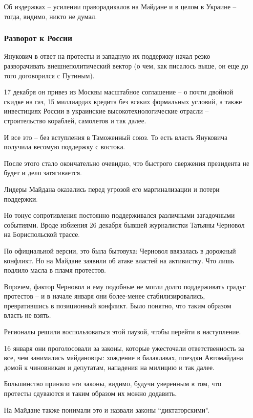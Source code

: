 Об издержках – усилении праворадикалов на Майдане и в целом в Украине –
тогда, видимо, никто не думал.  

\subsubsection{Разворот к России }

Янукович в ответ на протесты и западную их поддержку начал резко
разворачивать внешнеполитический вектор (о чем, как писалось выше, он еще
до того договорился с Путиным).

17 декабря он привез из Москвы масштабное соглашение – о почти двойной
скидке на газ, 15 миллиардах кредита без всяких формальных условий, а
также инвестициях России в украинские высокотехнологические отрасли –
строительство кораблей, самолетов и так далее. 

И все это – без вступления в Таможенный союз. То есть власть Януковича
получила весомую поддержку с востока.

После этого стало окончательно очевидно, что быстрого свержения президента
не будет и дело затягивается.

Лидеры Майдана оказались перед угрозой его маргинализации и потери
поддержки.

Но тонус сопротивления постоянно поддерживался различными загадочными
событиями. Вроде избиения 26 декабря бывшей журналистки Татьяны Черновол
на Бориспольской трассе.

По официальной версии, это была бытовуха: Черновол ввязалась в дорожный
конфликт. Но на Майдане заявили об атаке властей на активистку. Что лишь
подлило масла в пламя протестов. 

Впрочем, фактор Черновол и ему подобные не могли долго поддерживать градус
протестов – и в начале января они более-менее стабилизировались,
превратившись в позиционный конфликт. Было понятно, что таким образом
власть не взять.

Регионалы решили воспользоваться этой паузой, чтобы перейти в наступление.

16 января они проголосовали за законы, которые ужесточали ответственность
за все, чем занимались майдановцы: хождение в балаклавах, поездки
Автомайдана домой к чиновникам и депутатам, нападения на милицию и так
далее. 

Большинство приняло эти законы, видимо, будучи уверенным в том, что
протесты сдуваются и таким образом их можно додавить.

На Майдане также понимали это и назвали законы \enquote{диктаторскими}. 

